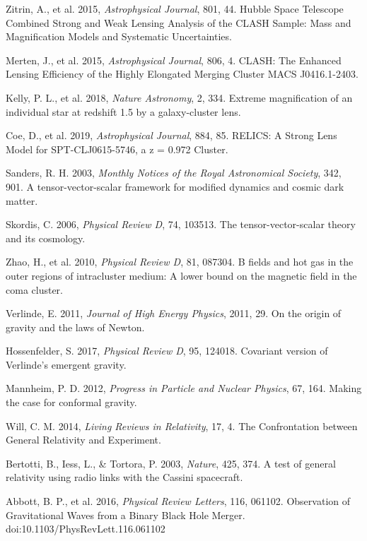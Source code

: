 \documentclass[12pt,a4paper]{article}
\begin{document}
\begin{thebibliography}{99}
 Zitrin, A., et al. 2015, \textit{Astrophysical Journal}, 801, 44. Hubble Space Telescope Combined Strong and Weak Lensing Analysis of the CLASH Sample: Mass and Magnification Models and Systematic Uncertainties.

 Merten, J., et al. 2015, \textit{Astrophysical Journal}, 806, 4. CLASH: The Enhanced Lensing Efficiency of the Highly Elongated Merging Cluster MACS J0416.1-2403.

 Kelly, P. L., et al. 2018, \textit{Nature Astronomy}, 2, 334. Extreme magnification of an individual star at redshift 1.5 by a galaxy-cluster lens.

 Coe, D., et al. 2019, \textit{Astrophysical Journal}, 884, 85. RELICS: A Strong Lens Model for SPT-CLJ0615-5746, a z = 0.972 Cluster.

 Sanders, R. H. 2003, \textit{Monthly Notices of the Royal Astronomical Society}, 342, 901. A tensor-vector-scalar framework for modified dynamics and cosmic dark matter.

 Skordis, C. 2006, \textit{Physical Review D}, 74, 103513. The tensor-vector-scalar theory and its cosmology.

 Zhao, H., et al. 2010, \textit{Physical Review D}, 81, 087304. B fields and hot gas in the outer regions of intracluster medium: A lower bound on the magnetic field in the coma cluster.

 Verlinde, E. 2011, \textit{Journal of High Energy Physics}, 2011, 29. On the origin of gravity and the laws of Newton.

 Hossenfelder, S. 2017, \textit{Physical Review D}, 95, 124018. Covariant version of Verlinde's emergent gravity.

 Mannheim, P. D. 2012, \textit{Progress in Particle and Nuclear Physics}, 67, 164. Making the case for conformal gravity.

 Will, C. M. 2014, \textit{Living Reviews in Relativity}, 17, 4. The Confrontation between General Relativity and Experiment.

 Bertotti, B., Iess, L., \& Tortora, P. 2003, \textit{Nature}, 425, 374. A test of general relativity using radio links with the Cassini spacecraft.

 Abbott, B. P., et al. 2016, \textit{Physical Review Letters}, 116, 061102. Observation of Gravitational Waves from a Binary Black Hole Merger. doi:10.1103/PhysRevLett.116.061102


\end{thebibliography}
\end{document}
